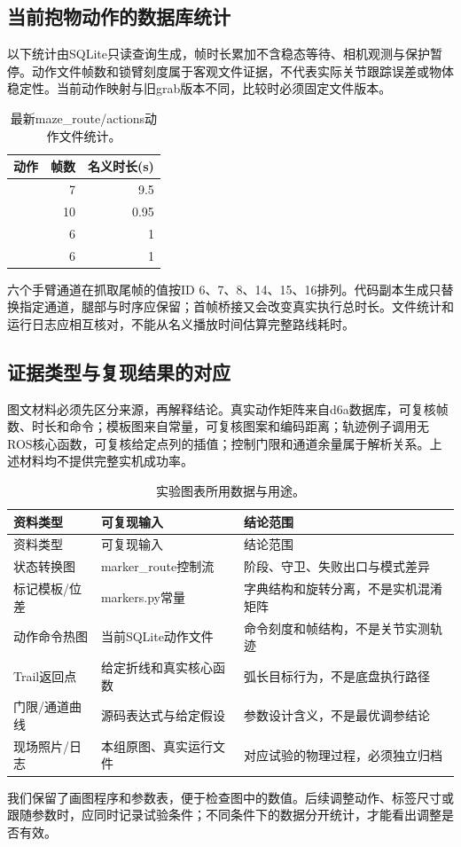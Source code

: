 \subsection{当前抱物动作的数据库统计}
以下统计由SQLite只读查询生成，帧时长累加不含稳态等待、相机观测与保护暂停。动作文件帧数和锁臂刻度属于客观文件证据，不代表实际关节跟踪误差或物体稳定性。当前动作映射与旧grab版本不同，比较时必须固定文件版本。
\begin{table}[H]\centering\small\begin{tabularx}{\linewidth}{Yrr}\toprule 动作 & 帧数 & 名义时长(s)\\\midrule
{} & 7 & 9.5\\
 & 10 & 0.95\\
 & 6 & 1\\
 & 6 & 1\\
\bottomrule\end{tabularx}\caption{最新maze\_route/actions动作文件统计。}\end{table}
六个手臂通道在抓取尾帧的值按ID 6、7、8、14、15、16排列。代码副本生成只替换指定通道，腿部与时序应保留；首帧桥接又会改变真实执行总时长。文件统计和运行日志应相互核对，不能从名义播放时间估算完整路线耗时。

\subsection{证据类型与复现结果的对应}
图文材料必须先区分来源，再解释结论。真实动作矩阵来自d6a数据库，可复核帧数、时长和命令；模板图来自常量，可复核图案和编码距离；轨迹例子调用无ROS核心函数，可复核给定点列的插值；控制门限和通道余量属于解析关系。上述材料均不提供完整实机成功率。
\begin{longtable}{p{28mm}p{46mm}p{58mm}}\caption{实验图表所用数据与用途。}\\\toprule 资料类型 & 可复现输入 & 结论范围\\\midrule\endfirsthead\toprule 资料类型 & 可复现输入 & 结论范围\\\midrule\endhead
状态转换图 & marker\_route控制流 & 阶段、守卫、失败出口与模式差异\\
标记模板/位差 & markers.py常量 & 字典结构和旋转分离，不是实机混淆矩阵\\
动作命令热图 & 当前SQLite动作文件 & 命令刻度和帧结构，不是关节实测轨迹\\
Trail返回点 & 给定折线和真实核心函数 & 弧长目标行为，不是底盘执行路径\\
门限/通道曲线 & 源码表达式与给定假设 & 参数设计含义，不是最优调参结论\\
现场照片/日志 & 本组原图、真实运行文件 & 对应试验的物理过程，必须独立归档\\\bottomrule\end{longtable}
我们保留了画图程序和参数表，便于检查图中的数值。后续调整动作、标签尺寸或跟随参数时，应同时记录试验条件；不同条件下的数据分开统计，才能看出调整是否有效。

